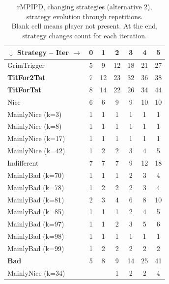 \documentclass[journal,10pt,twoside]{IEEEtran}
\begin{document}
\begin{table}[ht]
    \caption{rMPIPD, changing strategies (alternative 2), strategy evolution through repetitions.\\
    Blank cell means player not present. At the end, strategy changes count for each iteration.}
    \label{tab:cripdmpA2}
    \centering
    \begin{minipage}{.4\textwidth}
    \begin{tabular}{l|cccccc} \toprule
        $\downarrow$ Strategy -- Iter $\rightarrow$ & 0 & 1 & 2 & 3 & 4 & 5 \\ \midrule
        GrimTrigger         &   5 &   9 &   12 &   18 &   21 &   27 \\
        \textbf{TitFor2Tat} &   7 &  12 &   23 &   32 &   36 &   38 \\
        \textbf{TitForTat}  &   8 &  14 &   22 &   26 &   34 &   44 \\
        Nice                &   6 &   6 &    9 &    9 &   10 &   10 \\
        MainlyNice (k=3)    &   1 &   1 &    1 &    1 &    1 &    1 \\
        MainlyNice (k=8)    &   1 &   1 &    1 &    1 &    1 &    1 \\
        MainlyNice (k=17)   &   1 &   1 &    1 &    1 &    1 &    1 \\
        MainlyNice (k=42)   &   1 &   2 &    2 &    3 &    4 &    5 \\
        Indifferent         &   7 &   7 &    7 &    9 &   12 &   18 \\
        MainlyBad (k=70)    &   1 &   1 &    1 &    2 &    3 &    4 \\
        MainlyBad (k=78)    &   1 &   2 &    2 &    2 &    3 &    4 \\
        MainlyBad (k=81)    &   2 &   3 &    4 &    6 &    8 &   10 \\
        MainlyBad (k=85)    &   1 &   1 &    1 &    2 &    4 &    5 \\
        MainlyBad (k=97)    &   1 &   1 &    2 &    3 &    5 &    6 \\
        MainlyBad (k=98)    &   1 &   1 &    1 &    1 &    1 &    1 \\
        MainlyBad (k=99)    &   1 &   2 &    2 &    2 &    2 &    2 \\
        \textbf{Bad}        &   5 &   8 &    9 &   14 &   25 &   41 \\
        MainlyNice (k=34)   &     &     &    1 &    2 &    2 &    4 \\

\end{tabular}
\end{minipage}
\end{table}
\end{document}

